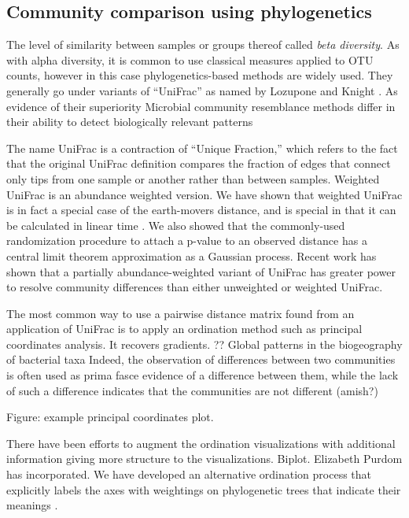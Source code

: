 \documentclass{amsart}
\begin{document}
\subsection{Community comparison using phylogenetics}
The level of similarity between samples or groups thereof called \emph{beta diversity}.
As with alpha diversity, it is common to use classical measures \citep[e.g.][]{jaccard1908nouvelles} applied to OTU counts, however in this case phylogenetics-based methods are widely used.
They generally go under variants of ``UniFrac'' as named by Lozupone and Knight \citep{LozuponeKnightUniFrac05;LozuponeEaWeightedUnifrac07}.
As evidence of their superiority
\citep{kuczynski2010microbial} Microbial community resemblance methods differ in their ability to detect biologically relevant patterns

The name UniFrac is a contraction of ``Unique Fraction,'' which refers to the fact that the original UniFrac definition compares the fraction of edges that connect only tips from one sample or another rather than between samples.
Weighted UniFrac is an abundance weighted version.
We have shown that weighted UniFrac is in fact a special case of the earth-movers distance, and is special in that it can be calculated in linear time \citep{evans2012phylogenetic}.
We also showed that the commonly-used randomization procedure to attach a p-value to an observed distance has a central limit theorem approximation as a Gaussian process.
Recent work \citep{chen2012associating} has shown that a partially abundance-weighted variant of UniFrac has greater power to resolve community differences than either unweighted or weighted UniFrac.

The most common way to use a pairwise distance matrix found from an application of UniFrac is to apply an ordination method such as principal coordinates analysis.
It recovers gradients.
\citep{nemergut2011global}
?? Global patterns in the biogeography of bacterial taxa
Indeed, the observation of differences between two communities is often used as prima fasce evidence of a difference between them, while the lack of such a difference indicates that the communities are not different (amish?)

Figure: example principal coordinates plot.

There have been efforts to augment the ordination visualizations with additional information giving more structure to the visualizations.
Biplot.
Elizabeth Purdom \citep{BikEaMicrobiotaStomach06,PurdomAnalyzingDataGraphs08} has incorporated.
We have developed an alternative ordination process that explicitly labels the axes with weightings on phylogenetic trees that indicate their meanings \citep{matsen2013edge}.
\end{document}

